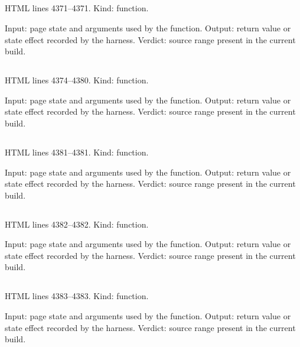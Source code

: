\subsection*{\texttt{}}
\label{vf_165_sopChanged}
HTML lines 4371--4371. Kind: function.

Input: page state and arguments used by the function.
Output: return value or state effect recorded by the harness.
Verdict: source range present in the current build.

\subsection*{\texttt{}}
\label{vf_166_sopMatcher}
HTML lines 4374--4380. Kind: function.

Input: page state and arguments used by the function.
Output: return value or state effect recorded by the harness.
Verdict: source range present in the current build.

\subsection*{\texttt{}}
\label{vf_167_sopNum}
HTML lines 4381--4381. Kind: function.

Input: page state and arguments used by the function.
Output: return value or state effect recorded by the harness.
Verdict: source range present in the current build.

\subsection*{\texttt{}}
\label{vf_168_sopCq}
HTML lines 4382--4382. Kind: function.

Input: page state and arguments used by the function.
Output: return value or state effect recorded by the harness.
Verdict: source range present in the current build.

\subsection*{\texttt{}}
\label{vf_169_sopOmitted}
HTML lines 4383--4383. Kind: function.

Input: page state and arguments used by the function.
Output: return value or state effect recorded by the harness.
Verdict: source range present in the current build.

